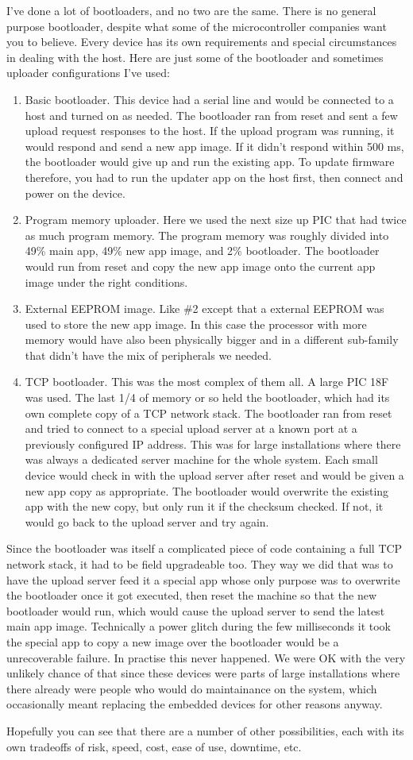 \documentclass[a4paper]{article}
\begin{document}
I've done a lot of bootloaders, and no two are the same. There is no general
purpose bootloader, despite what some of the microcontroller companies want you
to believe. Every device has its own requirements and special circumstances in
dealing with the host. Here are just some of the bootloader and sometimes
uploader configurations I've used:

\begin{enumerate}
\item Basic bootloader. This device had a serial line and would be connected to a host
and turned on as needed. The bootloader ran from reset and sent a few upload
request responses to the host. If the upload program was running, it would
respond and send a new app image. If it didn't respond within 500 ms, the
bootloader would give up and run the existing app. To update firmware therefore,
you had to run the updater app on the host first, then connect and power on the
device.
\item Program memory uploader. Here we used the next size up PIC that had twice as
much program memory. The program memory was roughly divided into 49\% main app,
49\% new app image, and 2\% bootloader. The bootloader would run from reset and
copy the new app image onto the current app image under the right conditions.
\item External EEPROM image. Like \#2 except that a external EEPROM was used to store
the new app image. In this case the processor with more memory would have also
been physically bigger and in a different sub-family that didn't have the mix of
peripherals we needed.
\item TCP bootloader. This was the most complex of them all. A large PIC 18F was used.
The last 1/4 of memory or so held the bootloader, which had its own complete
copy of a TCP network stack. The bootloader ran from reset and tried to connect
to a special upload server at a known port at a previously configured IP
address. This was for large installations where there was always a dedicated
server machine for the whole system. Each small device would check in with the
upload server after reset and would be given a new app copy as appropriate. The
bootloader would overwrite the existing app with the new copy, but only run it
if the checksum checked. If not, it would go back to the upload server and try
again.
\end{enumerate}

Since the bootloader was itself a complicated piece of code containing a full
TCP network stack, it had to be field upgradeable too. They way we did that was
to have the upload server feed it a special app whose only purpose was to
overwrite the bootloader once it got executed, then reset the machine so that
the new bootloader would run, which would cause the upload server to send the
latest main app image. Technically a power glitch during the few milliseconds it
took the special app to copy a new image over the bootloader would be a
unrecoverable failure. In practise this never happened. We were OK with the very
unlikely chance of that since these devices were parts of large installations
where there already were people who would do maintainance on the system, which
occasionally meant replacing the embedded devices for other reasons anyway.

Hopefully you can see that there are a number of other possibilities, each with
its own tradeoffs of risk, speed, cost, ease of use, downtime, etc.
\end{document}

